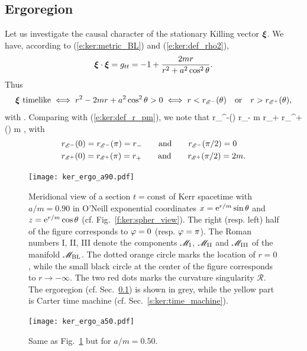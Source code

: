 \subsection{Ergoregion} \label{s:ker:ergoregion}

Let us investigate the causal character of the stationary Killing vector $\bm{\xi}$.
We have, according to (\ref{e:ker:metric_BL}) and (\ref{e:ker:def_rho2}),
\[
    \bm{\xi}\cdot\bm{\xi} = g_{tt} = - 1 + \frac{2m r}{r^2 + a^2\cos^2\theta} .
\]
Thus
\[
    \bm{\xi}\ \mbox{timelike} \iff r^2 - 2 m r + a^2\cos^2\theta > 0
        \iff r < r_{\mathscr{E}^-}(\theta) \quad\mbox{or}\quad  r > r_{\mathscr{E}^+}(\theta) ,
\]
with
\be \label{e:ker:ergosphere_radius}
     .
\ee
Comparing with (\ref{e:ker:def_r_pm}), we note that
 \leq r_{\E^-}(\theta) \leq r_- \leq m \leq r_+ \leq r_{\E^+}(\theta)
         m ,
\ee
with
\begin{subequations}
\begin{align}
 & r_{\mathscr{E}^-}(0)  = r_{\mathscr{E}^-}(\pi) = r_- \qquad\mbox{and}\qquad r_{\mathscr{E}^-}(\pi/2) = 0     \label{e:ker:r_ergo_m_eq}  \\
 & r_{\mathscr{E}^+}(0)  = r_{\mathscr{E}^+}(\pi) = r_+ \qquad\mbox{and}\qquad r_{\mathscr{E}^+}(\pi/2) = 2 m . \label{e:ker:r_ergo_p_eq}
\end{align}
\end{subequations}

\begin{figure}
\centerline{\texttt{[image: ker\_ergo\_a90.pdf]}}
\caption[]{\label{f:ker:ergo_a90} \footnotesize
Meridional view of a section $t=\mathrm{const}$ of Kerr spacetime with $a/m=0.90$ in
O'Neill exponential coordinates $x = \mathrm{e}^{r/m}\sin\theta$ and $z = \mathrm{e}^{r/m}\cos\theta$ (cf. Fig.~\ref{f:ker:spher_view}).
The right (resp. left) half of the figure corresponds to $\varphi=0$ (resp. $\varphi=\pi$).
The Roman numbers I, II, III denote the components $\mathscr{M}_{\rm I}$, $\mathscr{M}_{\rm II}$ and
$\mathscr{M}_{\rm III}$ of the manifold $\mathscr{M}_{\rm BL}$. The dotted orange circle marks the location
of $r=0$, while the small black circle at the center of the figure corresponds to
$r\rightarrow -\infty$. The two red dots marks the curvature singularity $\mathscr{R}$.
The ergoregion (cf. Sec.~\ref{s:ker:ergoregion}) is shown in grey, while the
yellow part is Carter time machine (cf. Sec.~\ref{s:ker:time_machine}).
}
\end{figure}

\begin{figure}
\centerline{\texttt{[image: ker\_ergo\_a50.pdf]}}
\caption[]{\label{f:ker:ergo_a50} \footnotesize
Same as Fig.~\ref{f:ker:ergo_a90} but for $a/m=0.50$.
}
\end{figure}

